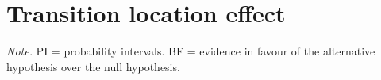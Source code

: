 \documentclass[
  man,floatsintext]{apa7}
\begin{document}
\begin{center}
\begin{ThreePartTable}
{}

\end{ThreePartTable}
\end{center}

\newpage

\hypertarget{transition-location-effect-1}{%
\section{Transition location effect}\label{transition-location-effect-1}}

\begin{center}
\begin{ThreePartTable}

\begin{TableNotes}[para]
\normalsize{\textit{Note.} PI = probability intervals. BF = evidence in favour of the alternative hypothesis over the null hypothesis.}
\end{TableNotes}

\footnotesize{

}
\end{ThreePartTable}
\end{center}
\end{document}
